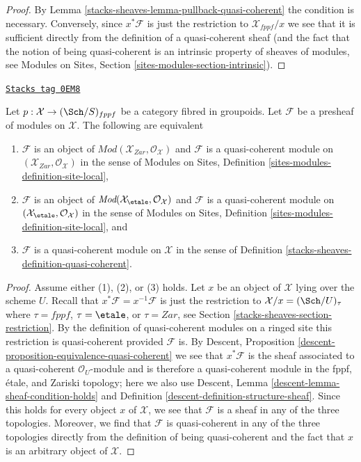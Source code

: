 \begin{proof}
By
Lemma \ref{stacks-sheaves-lemma-pullback-quasi-coherent}
the condition is necessary. Conversely, since $x^*\mathcal{F}$
is just the restriction to $\mathcal{X}_{fppf}/x$ we see that it
is sufficient directly from the definition of a quasi-coherent sheaf
(and the fact that the notion of being quasi-coherent is an intrinsic
property of sheaves of modules, see
Modules on Sites, Section \ref{sites-modules-section-intrinsic}).
\end{proof}

\begin{lemma}
\label{stacks-sheaves-lemma-characterize-quasi-coherent-bis}
\href{https://stacks.math.columbia.edu/tag/0EM8}{\texttt{Stacks tag 0EM8}}

Let $p : \mathcal{X} \to (\Sch/S)_{fppf}$ be a category
fibred in groupoids. Let $\mathcal{F}$ be a presheaf of
modules on $\mathcal{X}$. The following are equivalent
\begin{enumerate}
\item $\mathcal{F}$ is an object of
$\textit{Mod}(\mathcal{X}_{Zar}, \mathcal{O}_\mathcal{X})$
and $\mathcal{F}$ is a quasi-coherent module on
$(\mathcal{X}_{Zar}, \mathcal{O}_\mathcal{X})$ in the sense of
Modules on Sites, Definition \ref{sites-modules-definition-site-local},
\item $\mathcal{F}$ is an object of
$\textit{Mod}(\mathcal{X}_\etale, \mathcal{O}_\mathcal{X})$
and $\mathcal{F}$ is a quasi-coherent module on
$(\mathcal{X}_\etale, \mathcal{O}_\mathcal{X})$ in the sense of
Modules on Sites, Definition \ref{sites-modules-definition-site-local}, and
\item $\mathcal{F}$ is a quasi-coherent module on $\mathcal{X}$
in the sense of Definition \ref{stacks-sheaves-definition-quasi-coherent}.
\end{enumerate}
\end{lemma}

\begin{proof}
Assume either (1), (2), or (3) holds.
Let $x$ be an object of $\mathcal{X}$ lying over the scheme $U$.
Recall that $x^*\mathcal{F} = x^{-1}\mathcal{F}$ is just the
restriction to $\mathcal{X}/x = (\Sch/U)_\tau$ where
$\tau = fppf$, $\tau = \etale$, or $\tau = Zar$, see
Section \ref{stacks-sheaves-section-restriction}.
By the definition of quasi-coherent modules on a ringed site
this restriction is quasi-coherent provided $\mathcal{F}$ is.
By Descent, Proposition \ref{descent-proposition-equivalence-quasi-coherent}
we see that $x^*\mathcal{F}$ is the sheaf associated to
a quasi-coherent $\mathcal{O}_U$-module and is therefore
a quasi-coherent module in the fppf, \'etale, and Zariski
topology; here we also use
Descent, Lemma \ref{descent-lemma-sheaf-condition-holds} and
Definition \ref{descent-definition-structure-sheaf}.
Since this holds for every object $x$ of $\mathcal{X}$,
we see that $\mathcal{F}$ is a sheaf in any of the three topologies.
Moreover, we find that $\mathcal{F}$ is quasi-coherent in any
of the three topologies directly from the definition of being
quasi-coherent and the fact that $x$ is an arbitrary object of $\mathcal{X}$.
\end{proof}

